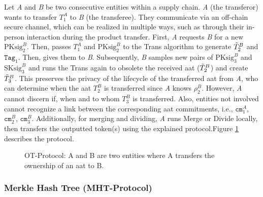 Let \textit{A} and \textit{B} be two consecutive entities within a supply chain. \textit{A} (the transferor) wants to transfer $T^A_1$ to \textit{B} (the transferee). They communicate via an off-chain secure channel, which can be realized in multiple ways, such as through their in-person interaction during the product transfer. First, \textit{A} requests \textit{B} for a new $\text{PKsig}^B_2$. Then, passes $T^A_1$ and $\text{PKsig}^B_2$ to the \textsf{Trans} algorithm to generate $\Tilde{T}^B_2$ and $\texttt{Tag}_1$. Then, gives them to \textit{B}. Subsequently, \textit{B} samples  new pairs of $\text{PKsig}^B_3$ and $\text{SKsig}^B_3$ and runs the \textsf{Trans} again to obsolete the received \gls{aat} ($\Tilde{T}^B_2$) and create $\Tilde{T}^B_3$. This preserves the privacy of the lifecycle of the transferred \gls{aat} from \textit{A}, who can determine when the \gls{aat} $T_2^B$ is transferred since \textit{A} knows $\rho_2^B$. However, \textit{A} cannot discern if, when and to whom $T_3^B$ is transferred. Also, entities not involved cannot recognize a link between the corresponding \gls{aat} commitments, i.e., $\texttt{cm}^A_1$, $\texttt{cm}^B_2$, $\texttt{cm}^B_3$. Additionally, for merging and dividing, \textit{A} runs \textsf{Merge} or \textsf{Divide} locally, then transfers the outputted token(s) using the explained protocol.Figure \ref{fig:Ownership Transfer} describes the protocol.

\begin{figure}[h]
    \centering
    {
    
    }
    \vspace{-5pt} 
    \caption[Anonymous Authentication Token Ownership Transfer]{\textsf{OT-Protocol}: A and B are two entities where A transfers the ownership of an \gls{aat} to B.}
    \label{fig:Ownership Transfer}
\end{figure}

\newpage

\subsubsection{Merkle Hash Tree (\textsf{MHT-Protocol})}
\label{sec:MerkleTreeStructure}

